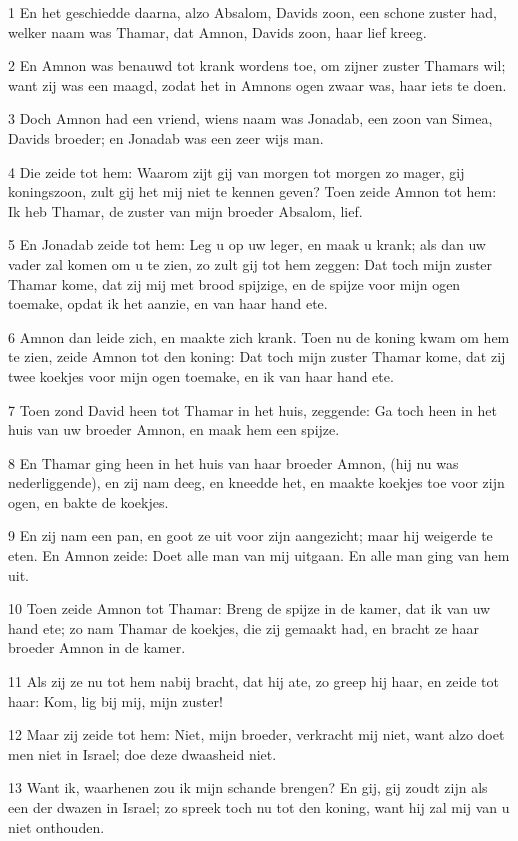 \par 1 En het geschiedde daarna, alzo Absalom, Davids zoon, een schone zuster had, welker naam was Thamar, dat Amnon, Davids zoon, haar lief kreeg.
\par 2 En Amnon was benauwd tot krank wordens toe, om zijner zuster Thamars wil; want zij was een maagd, zodat het in Amnons ogen zwaar was, haar iets te doen.
\par 3 Doch Amnon had een vriend, wiens naam was Jonadab, een zoon van Simea, Davids broeder; en Jonadab was een zeer wijs man.
\par 4 Die zeide tot hem: Waarom zijt gij van morgen tot morgen zo mager, gij koningszoon, zult gij het mij niet te kennen geven? Toen zeide Amnon tot hem: Ik heb Thamar, de zuster van mijn broeder Absalom, lief.
\par 5 En Jonadab zeide tot hem: Leg u op uw leger, en maak u krank; als dan uw vader zal komen om u te zien, zo zult gij tot hem zeggen: Dat toch mijn zuster Thamar kome, dat zij mij met brood spijzige, en de spijze voor mijn ogen toemake, opdat ik het aanzie, en van haar hand ete.
\par 6 Amnon dan leide zich, en maakte zich krank. Toen nu de koning kwam om hem te zien, zeide Amnon tot den koning: Dat toch mijn zuster Thamar kome, dat zij twee koekjes voor mijn ogen toemake, en ik van haar hand ete.
\par 7 Toen zond David heen tot Thamar in het huis, zeggende: Ga toch heen in het huis van uw broeder Amnon, en maak hem een spijze.
\par 8 En Thamar ging heen in het huis van haar broeder Amnon, (hij nu was nederliggende), en zij nam deeg, en kneedde het, en maakte koekjes toe voor zijn ogen, en bakte de koekjes.
\par 9 En zij nam een pan, en goot ze uit voor zijn aangezicht; maar hij weigerde te eten. En Amnon zeide: Doet alle man van mij uitgaan. En alle man ging van hem uit.
\par 10 Toen zeide Amnon tot Thamar: Breng de spijze in de kamer, dat ik van uw hand ete; zo nam Thamar de koekjes, die zij gemaakt had, en bracht ze haar broeder Amnon in de kamer.
\par 11 Als zij ze nu tot hem nabij bracht, dat hij ate, zo greep hij haar, en zeide tot haar: Kom, lig bij mij, mijn zuster!
\par 12 Maar zij zeide tot hem: Niet, mijn broeder, verkracht mij niet, want alzo doet men niet in Israel; doe deze dwaasheid niet.
\par 13 Want ik, waarhenen zou ik mijn schande brengen? En gij, gij zoudt zijn als een der dwazen in Israel; zo spreek toch nu tot den koning, want hij zal mij van u niet onthouden.
